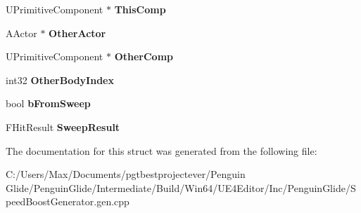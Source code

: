 \begin{DoxyCompactItemize}
\item 
\mbox{\label{struct_z___construct___u_function___a_speed_boost_generator___notify___statics_1_1_speed_boost_generator__event_notify___parms_a1ac8e4aab871bc8e75bb8ee7f7c920ed}} 
U\+Primitive\+Component $\ast$ {\bfseries This\+Comp}
\item 
\mbox{\label{struct_z___construct___u_function___a_speed_boost_generator___notify___statics_1_1_speed_boost_generator__event_notify___parms_a980a3c13fca563b72bdc633202369b29}} 
A\+Actor $\ast$ {\bfseries Other\+Actor}
\item 
\mbox{\label{struct_z___construct___u_function___a_speed_boost_generator___notify___statics_1_1_speed_boost_generator__event_notify___parms_ab92d451fac5b311f8f3d1ec02feb1e35}} 
U\+Primitive\+Component $\ast$ {\bfseries Other\+Comp}
\item 
\mbox{\label{struct_z___construct___u_function___a_speed_boost_generator___notify___statics_1_1_speed_boost_generator__event_notify___parms_a65b9345950939127ce981078b8bfce57}} 
int32 {\bfseries Other\+Body\+Index}
\item 
\mbox{\label{struct_z___construct___u_function___a_speed_boost_generator___notify___statics_1_1_speed_boost_generator__event_notify___parms_ae065f904c76d8f74203abb62e81e7312}} 
bool {\bfseries b\+From\+Sweep}
\item 
\mbox{\label{struct_z___construct___u_function___a_speed_boost_generator___notify___statics_1_1_speed_boost_generator__event_notify___parms_a8a5e163f908e515ede708e327b6ce2bb}} 
F\+Hit\+Result {\bfseries Sweep\+Result}
\end{DoxyCompactItemize}


The documentation for this struct was generated from the following file\+:\begin{DoxyCompactItemize}
\item 
C\+:/\+Users/\+Max/\+Documents/pgtbestprojectever/\+Penguin Glide/\+Penguin\+Glide/\+Intermediate/\+Build/\+Win64/\+U\+E4\+Editor/\+Inc/\+Penguin\+Glide/Speed\+Boost\+Generator.\+gen.\+cpp\end{DoxyCompactItemize}
